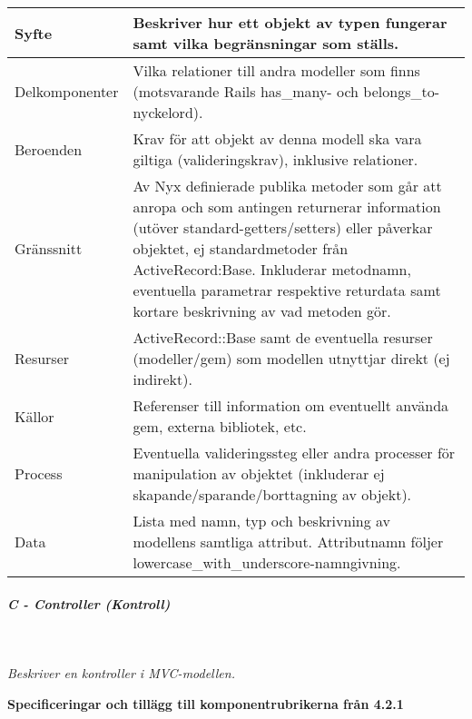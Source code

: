 \documentclass[a4paper, twoside, 11pt, titlepage]{article}
\begin{document}
				\begin {table} [ht] \begin{tabular} { p{2.6cm} p{12.5cm} }
					\hline
					Syfte & Beskriver hur ett objekt av typen fungerar samt vilka begränsningar som ställs.  \\
					\hline
					Delkomponenter & Vilka relationer till andra modeller som finns (motsvarande Rails has\_many- och belongs\_to-nyckelord).  \\
					\hline
					Beroenden & Krav för att objekt av denna modell ska vara giltiga (valideringskrav), inklusive relationer.  \\
					\hline
					Gränssnitt & Av Nyx definierade publika metoder som går att anropa och som antingen returnerar information (utöver standard-getters/setters) eller påverkar objektet, ej standardmetoder från ActiveRecord:Base. Inkluderar metodnamn, eventuella parametrar respektive returdata samt kortare beskrivning av vad metoden gör.  \\
					\hline
					Resurser & ActiveRecord::Base samt de eventuella resurser (modeller/gem) som modellen utnyttjar direkt (ej indirekt).  \\
					\hline
					Källor & Referenser till information om eventuellt använda gem, externa bibliotek, etc.  \\
					\hline
					Process & Eventuella valideringssteg eller andra processer för manipulation av objektet (inkluderar ej skapande/sparande/borttagning av objekt).  \\
					\hline
					Data & Lista med namn, typ och beskrivning av modellens samtliga attribut. Attributnamn följer lowercase\_with\_underscore-namngivning.  \\
					\hline
				\end{tabular} \end{table} \FloatBarrier


			\subparagraph{\emph{C - Controller (\emph{Kontroll})}}\

				\emph{Beskriver en kontroller i MVC-modellen.}

				\textbf{Specificeringar och tillägg till komponentrubrikerna från 4.2.1}
\end{document}
